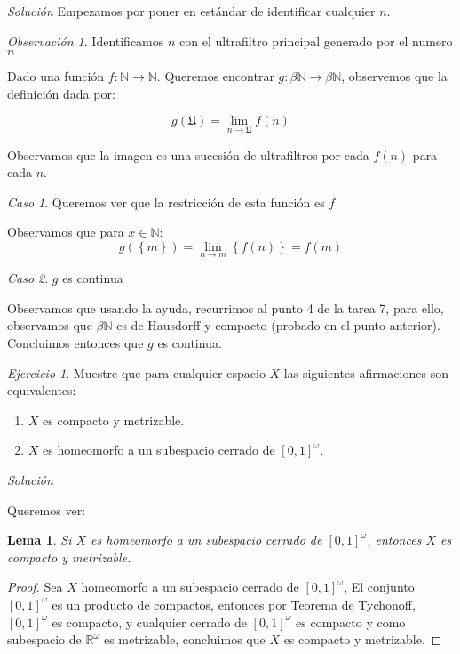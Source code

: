 \documentclass[11pt,a4paper,draft]{article}
\newtheorem{lem}[thm]{Lema}
\theoremstyle{definition}
\theoremstyle{remark}
\newtheorem*{rem}{Observación}
\newtheorem{case}{Caso}
\newtheorem{exc}{Ejercicio}
\newcommand{\set}[1]{\left\lbrace #1 \right\rbrace}
\begin{document}
\textit{Solución}
Empezamos por poner en estándar de identificar cualquier $ n $.

\begin{rem}
	Identificamos $ n $ con el ultrafiltro principal generado por el numero $ n $
\end{rem}

Dado una función $ f: \mathbb{N} \rightarrow \mathbb{N} $. Queremos encontrar $ g: \beta \mathbb{N} \rightarrow \beta \mathbb{N} $, observemos que la definición dada por:

\[  g(\mathfrak{U}) = \lim_{n \rightarrow \mathfrak{U}} f(n)  \]

Observamos que la imagen es una sucesión de ultrafiltros por cada $ f(n) $ para cada $ n $.
\begin{case}
	Queremos ver que la restricción de esta función es $ f $ 
\end{case} 
Observamos que para $ x \in \mathbb{N} $:
\[ g(\set{m})= \lim\limits_{n \rightarrow m} \set{f(n)} = f(m) \]
\begin{case}
	$ g $ es continua
\end{case}
Observamos que usando la ayuda, recurrimos al punto 4 de la tarea 7, para ello, observamos que $ \beta\mathbb{N} $ es de Hausdorff y compacto (probado en el punto anterior). Concluimos entonces que $ g $  es continua.


\begin{exc}
	Muestre que para cualquier espacio $ X $ las siguientes afirmaciones son equivalentes:
	\begin{enumerate}
		\item $ X $ es compacto y metrizable.
		\item $ X $ es homeomorfo a un subespacio cerrado de $ [0,1]^\omega $.
	\end{enumerate}
\end{exc}

\textit{Solución}

Queremos ver:

\begin{lem}
	Si $ X $ es homeomorfo a un subespacio cerrado de $ [0,1]^\omega $, entonces $ X $ es compacto y metrizable. 
\end{lem}

\begin{proof}
	Sea $ X $ homeomorfo a un subespacio cerrado de $ [0,1]^\omega $,  El conjunto $ [0,1]^\omega $ es un producto de compactos, entonces por Teorema de Tychonoff, $ [0,1]^\omega $ es compacto, y cualquier cerrado de $ [0,1]^\omega $ es compacto y como subespacio de $ \mathbb{R}^\omega  $ es metrizable, concluimos que $ X $ es compacto y metrizable.
\end{proof}
\end{document}
